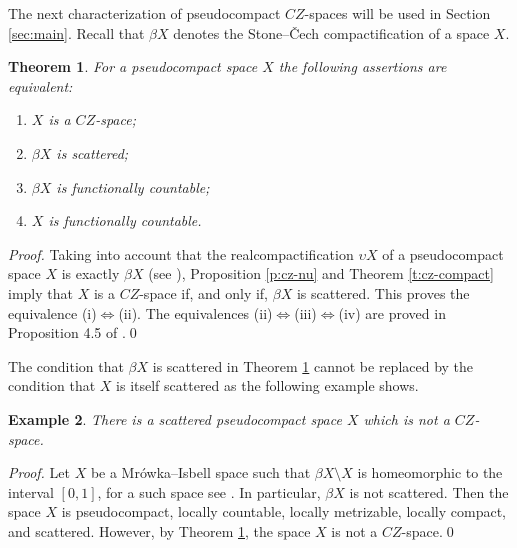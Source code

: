 \documentclass[preprint,11pt]{elsarticle}
\newtheorem{theorem}{Theorem}[section]
\newtheorem{example}[theorem]{Example}
\numberwithin{equation}{section}
\numberwithin{theorem}{section}
\newcommand{\LRa}{\Leftrightarrow}
\begin{document}
The next characterization of pseudocompact $CZ$-spaces will be used in Section \ref{sec:main}. Recall that $\beta X$ denotes the Stone--\v{C}ech compactification of a space $X$.

\begin{theorem}\label{t:cz-pseudocompact} For a pseudocompact space $X$ the following assertions are equivalent:
\begin{enumerate}
\item[{\rm(i)}] $X$ is  a $CZ$-space;
\item[{\rm(ii)}] $\beta X$ is scattered;
\item[{\rm(iii)}] $\beta X$ is functionally countable;
\item[{\rm(iv)}] $X$ is functionally countable.
\end{enumerate}
\end{theorem}




\begin{proof}
Taking into account that the realcompactification $\upsilon X$ of a pseudocompact space $X$ is exactly $\beta X$ (see \cite[3.11.C]{Eng}), Proposition \ref{p:cz-nu} and Theorem \ref{t:cz-compact} imply that  $X$ is a $CZ$-space if, and only if, $\beta X$ is scattered. This proves the equivalence (i)$\LRa$(ii). The equivalences (ii)$\LRa$(iii)$\LRa$(iv) are proved in Proposition 4.5 of \cite{Choban-97}.\qed
\end{proof}


The condition that $\beta X$ is scattered in Theorem \ref{t:cz-pseudocompact} cannot be replaced by the condition that $X$ is itself scattered as the following example shows.
\begin{example}\label{Examp2}
There is a scattered pseudocompact space $X$ which is not a $CZ$-space.
\end{example}

\begin{proof}
Let $X$ be a Mr\'{o}wka--Isbell space such that $\beta X\setminus X$ is homeomorphic to the interval $[0,1]$, for a such space see \cite[Theorem 8.6.2]{HHH2018pc}. In particular, $\beta X$ is not scattered. Then the space $X$ is pseudocompact, locally countable, locally metrizable, locally compact, and scattered. However, by Theorem \ref{t:cz-pseudocompact}, the space $X$ is not a $CZ$-space.\qed
\end{proof}

\end{document}
